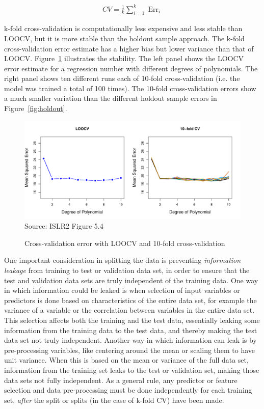 \begin{align*}
CV = \frac{1}{k} \sum\nolimits_{i=1}^k \operatorname{Err}_i
\end{align*}

k-fold cross-validation is computationally less expensive and less stable than LOOCV, but it is more stable than the holdout sample approach. The k-fold cross-validation error estimate has a higher bias but lower variance than that of LOOCV. Figure~\ref{fig:kfold} illustrates the stability. The left panel shows the LOOCV error estimate for a regression number with different degrees of polynomials. The right panel shows ten different runs each of 10-fold cross-validation (i.e. the model was trained a total of 100 times). The 10-fold cross-validation errors show a much smaller variation than the different holdout sample errors in Figure~\ref{fig:holdout}.

\begin{figure}
\centering

\includegraphics[width=\textwidth]{Figures_Chapters_1-6/Chapter5/5_4.pdf}
\scriptsize Source: ISLR2 Figure 5.4
\caption{Cross-validation error with LOOCV and 10-fold cross-validation}
\label{fig:kfold}
\end{figure}

One important consideration in splitting the data is preventing \emph{information leakage} from training to test or validation data set, in order to ensure that the test and validation data sets are truly independent of the training data. One way in which information could be leaked is when selection of input variables or predictors is done based on characteristics of the entire data set, for example the variance of a variable or the correlation between variables in the entire data set. This selection affects both the training and the test data, essentially leaking some information from the training data to the test data, and thereby making the test data set not truly independent. Another way in which information can leak is by pre-processing variables, like centering around the mean or scaling them to have unit variance. When this is based on the mean or variance of the full data set, information from the training set leaks to the test or validation set, making those data sets not fully independent. As a general rule, any predictor or feature selection and data pre-processing must be done independently for each training set, \emph{after} the split or splits (in the case of k-fold CV) have been made. 

